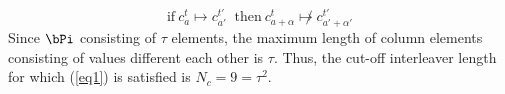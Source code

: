 \documentclass[11pt, oneside, dvipdfmx]{book}
\begin{document}
\begin{equation}
\text{if}~ c_a^t \mapsto c_{a'}^{t'} ~\text{ then} ~c_{a+\alpha}^t \not \mapsto c_{a'+\alpha'}^{t'}
\label{eq1}
\end{equation}
Since $\bPi$ consisting of $\tau$ elements, the maximum length of column elements consisting of values different each other is $\tau$. Thus, the cut-off interleaver length for which (\ref{eq1}) is satisfied is $N_c=9=\tau^2$.





\end{document}
